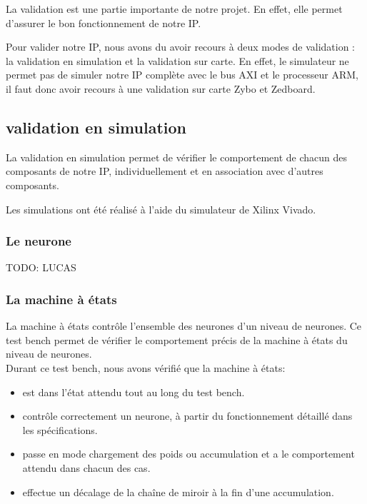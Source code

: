 
La validation est une partie importante de notre projet. En effet, elle permet
d'assurer le bon fonctionnement de notre IP.

Pour valider notre IP, nous avons du avoir recours à deux modes de validation :
la validation en simulation et la validation sur carte.
En effet, le simulateur ne permet pas de simuler notre IP complète avec le bus
AXI et le processeur ARM, il faut donc avoir recours à une validation sur carte
Zybo et Zedboard.

\subsection{validation en simulation}

La validation en simulation permet de vérifier le comportement de chacun des
composants de notre IP, individuellement et en association avec d'autres
composants.

Les simulations ont été réalisé à l'aide du simulateur de Xilinx Vivado.

\subsubsection{Le neurone}

TODO: LUCAS

\subsubsection{La machine à états}

La machine à états contrôle l'ensemble des neurones d'un niveau de neurones.
Ce test bench permet de vérifier le comportement précis de la machine
à états du niveau de neurones.\\

Durant ce test bench, nous avons vérifié que la machine à états:
\begin{itemize}
	\item est dans l'état attendu tout au long du test bench.
	\item contrôle correctement un neurone, à partir du fonctionnement
	détaillé dans les spécifications.
	\item passe en mode chargement des poids ou accumulation et a le
	comportement attendu dans chacun des cas.
	\item effectue un décalage de la chaîne de miroir à la fin d'une
	accumulation.
\end{itemize}

